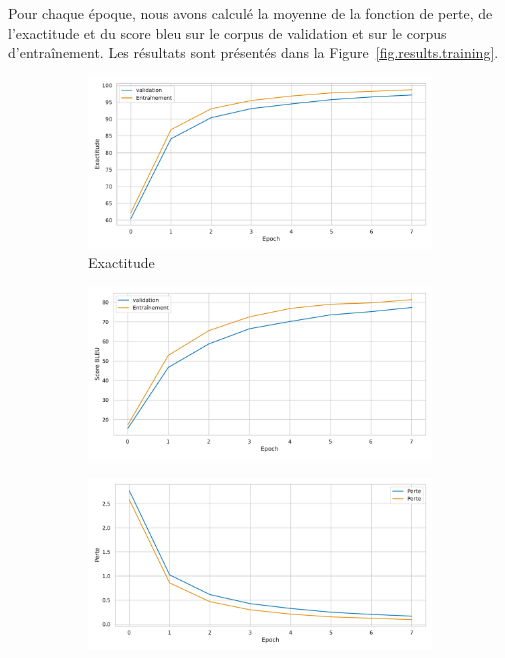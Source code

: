 Pour chaque époque, nous avons calculé la moyenne de la fonction de perte, de l'exactitude et du score \gls{bleu} 
sur le corpus de validation et sur le corpus d'entraînement.
Les résultats sont présentés dans la Figure~\ref{fig.results.training}.
\begin{figure}[hbt]
    \begin{subfigure}{.5\textwidth}
        \caption{Exactitude}
        \begin{center}
            \includegraphics[width=\textwidth]{assets/python/accuracy.pdf}
        \end{center}
        \label{fig.results.training.accuracy}
    \end{subfigure}
    \begin{subfigure}{.5\textwidth}
        \caption{}
        \begin{center}
            \includegraphics[width=\textwidth]{assets/python/bleu.pdf}
        \end{center}
        \label{fig.results.training.bleu}
    \end{subfigure}
    \begin{subfigure}{.5\textwidth}
        \begin{center}
            \includegraphics[width=\textwidth]{assets/python/loss.pdf}

\end{center}
\end{subfigure}
\end{figure}
